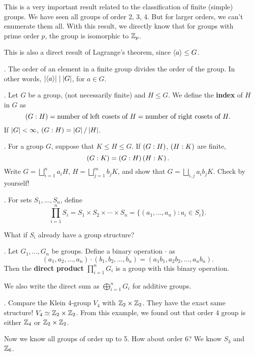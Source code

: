 This is a very important result related to the classification of finite (simple) groups. We have seen all groups of order 2, 3, 4. But for larger orders, we can't enumerate them all. With this result, we directly know that for groups with prime order \(p\), the group is isomorphic to \(\mathbb{Z}_p\).

\medskip

This is also a direct result of Lagrange's theorem, since \(\left\langle a \right\rangle \leq G\).

\thm. The order of an element in a finite group divides the order of the group. In other words, \(\left| \left\langle a \right\rangle \right| \mid \left| G \right|\), for \(a \in G\).

.  Let \(G\) be a group, (not necessarily finite) and \(H \leq G\). We define the \textbf{index} of \(H\) in \(G\) as
\[
    \left(G : H\right) = \text{number of left cosets of } H = \text{number of right cosets of } H.
\]
If \(\left| G \right| < \infty\), \(\left(G : H\right) = \left| G \right| / \left| H \right|\).

\thm. For a group \(G\), suppose that \(K \leq H \leq G\). If \(\left(G : H\right)\), \(\left(H : K\right)\) are finite,
\[
    \left(G : K\right) = \left(G : H\right)\left(H : K\right).
\]
\pf Write \(G = \bigsqcup_{i=1}^n a_i H\), \(H = \bigsqcup_{j=1}^m b_j K\), and show that \(G = \bigsqcup_{i, j} a_i b_j K\). Check by yourself!

\pagebreak


.  For sets \(S_1, \dots, S_n\), define
\[
    \prod_{i=1}^n S_i = S_1 \times S_2 \times \cdots \times S_n = \{(a_1, \dots, a_n) : a_i \in S_i\}.
\]

What if \(S_i\) already have a group structure?

.  Let \(G_1, \dots, G_n\) be groups. Define a binary operation \(\cdot\) as
\[
    (a_1, a_2, \dots, a_n) \cdot (b_1, b_2, \dots, b_n) = (a_1b_1, a_2b_2, \dots, a_nb_n).
\]
Then the \textbf{direct product} \(\prod_{i=1}^n G_i\) is a group with this binary operation.

\notation We also write the direct sum as \(\bigoplus_{i=1}^n G_i\) for additive groups.

\ex. Compare the Klein 4-group \(V_4\) with \(\mathbb{Z}_2 \times \mathbb{Z}_2\). They have the exact same structure! \(V_4 \simeq \mathbb{Z}_2 \times \mathbb{Z}_2\). From this example, we found out that order 4 group is either \(\mathbb{Z}_4\) or \(\mathbb{Z}_2 \times \mathbb{Z}_2\).

Now we know all groups of order up to 5. How about order 6? We know \(S_3\) and \(\mathbb{Z}_6\).

